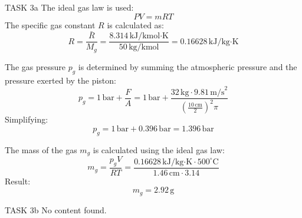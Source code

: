 TASK 3a  
The ideal gas law is used:  
\[
PV = mRT
\]  
The specific gas constant \( R \) is calculated as:  
\[
R = \frac{\bar{R}}{M_g} = \frac{8.314 \, \text{kJ}/\text{kmol·K}}{50 \, \text{kg}/\text{kmol}} = 0.16628 \, \text{kJ}/\text{kg·K}
\]  

The gas pressure \( p_g \) is determined by summing the atmospheric pressure and the pressure exerted by the piston:  
\[
p_g = 1 \, \text{bar} + \frac{F}{A} = 1 \, \text{bar} + \frac{32 \, \text{kg} \cdot 9.81 \, \text{m/s}^2}{\left(\frac{10 \, \text{cm}}{2}\right)^2 \pi}
\]  
Simplifying:  
\[
p_g = 1 \, \text{bar} + 0.396 \, \text{bar} = 1.396 \, \text{bar}
\]  

The mass of the gas \( m_g \) is calculated using the ideal gas law:  
\[
m_g = \frac{p_g V}{RT} = \frac{0.16628 \, \text{kJ}/\text{kg·K} \cdot 500^\circ\text{C}}{1.46 \, \text{cm} \cdot 3.14}
\]  
Result:  
\[
m_g = 2.92 \, \text{g}
\]  

TASK 3b  
No content found.